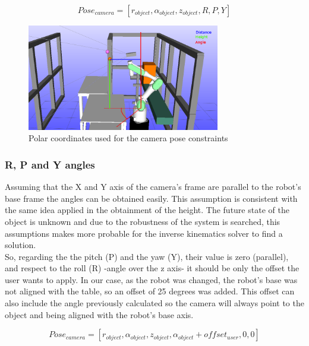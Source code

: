 		\begin{equation}
			\label{eq:cameras_pose_noRPY}
			Pose_{camera} = [r_{object},\alpha_{object},z_{object},R,P,Y]
		\end{equation}
	\begin{figure}[!ht]
	 	\centering
	 	\includegraphics[width=0.75\textwidth]{figures/path_planning_constraints}
	 	\caption{Polar coordinates used for the camera pose constraints}
	 	\label{fig:path_planning_constraints}
	 \end{figure} 
	 
	\subsubsection{R, P and Y angles} %
	\label{subsub:r_p_and_y_angles}
	Assuming that the X and Y axis of the camera's frame are parallel to the robot's base frame the angles can be obtained easily.
	This assumption is consistent with the same idea applied in the obtainment of the height. 
	The future state of the object is unknown and due to the robustness of the system is searched, this assumptions makes more probable for the inverse kinematics solver to find a solution.\\


	So, regarding the the pitch (P) and the yaw (Y), their value is zero (parallel), and respect to the roll (R) -angle over the z axis- it should be only the offset the user wants to apply. 
	In our case, as the robot was changed, the robot's base was not aligned with the table, so an offset of 25 degrees was added.
	This offset can also include the angle previously calculated so the camera will always point to the object and being aligned with the robot's base axis.

		\begin{equation}
			\label{eq:cameras_pose}
			Pose_{camera} = [r_{object},\alpha_{object},z_{object},\alpha_{object}+offset_{user},0,0]
		\end{equation}

